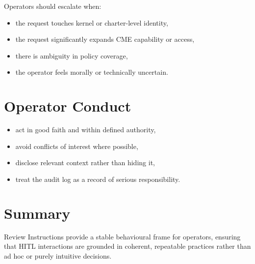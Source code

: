Operators should escalate when:

\begin{itemize}
    \item the request touches kernel or charter-level identity,
    \item the request significantly expands CME capability or access,
    \item there is ambiguity in policy coverage,
    \item the operator feels morally or technically uncertain.
\end{itemize}

\section{Operator Conduct}

\begin{itemize}
    \item act in good faith and within defined authority,
    \item avoid conflicts of interest where possible,
    \item disclose relevant context rather than hiding it,
    \item treat the audit log as a record of serious responsibility.
\end{itemize}

\section{Summary}

Review Instructions provide a stable behavioural frame for operators, ensuring
that HITL interactions are grounded in coherent, repeatable practices rather
than ad hoc or purely intuitive decisions.
